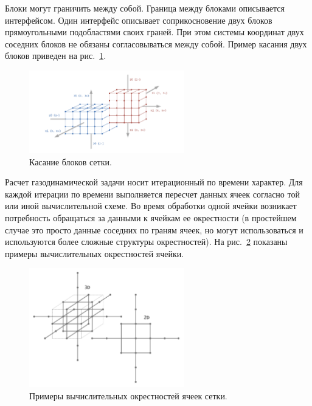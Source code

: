 Блоки могут граничить между собой.
Граница между блоками описывается интерфейсом.
Один интерфейс описывает соприкосновение двух блоков прямоугольными подобластями своих граней.
При этом системы координат двух соседних блоков не обязаны согласовываться между собой.
Пример касания двух блоков приведен на рис.~\ref{fig:text_2_block_block_block}.

\begin{figure}[ht]
	\centering
	\includegraphics[width=0.6\textwidth]{./pics/text_2_block/2-block-block.pdf}
	\caption{Касание блоков сетки.}
	\label{fig:text_2_block_block_block}
\end{figure}

Расчет газодинамической задачи носит итерационный по времени характер.
Для каждой итерации по времени выполняется пересчет данных ячеек согласно той или иной вычислительной схеме.
Во время обработки одной ячейки возникает потребность обращаться за данными к ячейкам ее окрестности (в простейшем случае это просто данные соседних по граням ячеек, но могут использоваться и используются более сложные структуры окрестностей).
На рис.~\ref{fig:text_2_block_cell_delta} показаны примеры вычислительных окрестностей ячейки.

\begin{figure}[ht]
	\centering
	\includegraphics[width=0.6\textwidth]{./pics/text_2_block/3-cell-delta.pdf}
	\caption{Примеры вычислительных окрестностей ячеек сетки.}
	\label{fig:text_2_block_cell_delta}
\end{figure}

